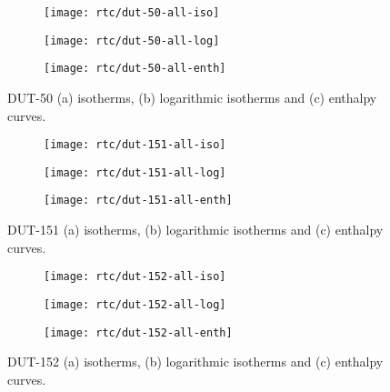 \begin{figure}[H]
    \centering
    \begin{subfigure}{0.33\linewidth}
        \texttt{[image: rtc/dut-50-all-iso]}%
        \caption{}
    \end{subfigure}%
    \begin{subfigure}{0.33\linewidth}
        \texttt{[image: rtc/dut-50-all-log]}%
        \caption{}
    \end{subfigure}%
    \begin{subfigure}{0.33\linewidth}
        \texttt{[image: rtc/dut-50-all-enth]}%
        \caption{}
    \end{subfigure}%
    \caption{DUT-50 (a) isotherms, (b) logarithmic isotherms and 
    (c) enthalpy curves.}%
    \label{appx:dut:fig:dut-50-butane-rtc}
\end{figure}

\begin{figure}[H]
    \centering
    \begin{subfigure}{0.33\linewidth}
        \texttt{[image: rtc/dut-151-all-iso]}%
        \caption{}
    \end{subfigure}%
    \begin{subfigure}{0.33\linewidth}
        \texttt{[image: rtc/dut-151-all-log]}%
        \caption{}
    \end{subfigure}%
    \begin{subfigure}{0.33\linewidth}
        \texttt{[image: rtc/dut-151-all-enth]}%
        \caption{}
    \end{subfigure}%
    \caption{DUT-151 (a) isotherms, (b) logarithmic isotherms and 
    (c) enthalpy curves.}%
    \label{appx:dut:fig:dut-151-butane-rtc}
\end{figure}

\begin{figure}[H]
    \centering
    \begin{subfigure}{0.33\linewidth}
        \texttt{[image: rtc/dut-152-all-iso]}%
        \caption{}
    \end{subfigure}%
    \begin{subfigure}{0.33\linewidth}
        \texttt{[image: rtc/dut-152-all-log]}%
        \caption{}
    \end{subfigure}%
    \begin{subfigure}{0.33\linewidth}
        \texttt{[image: rtc/dut-152-all-enth]}%
        \caption{}
    \end{subfigure}%
    \caption{DUT-152 (a) isotherms, (b) logarithmic isotherms and 
    (c) enthalpy curves.}%
    \label{appx:dut:fig:dut-152-butane-rtc}
\end{figure}

